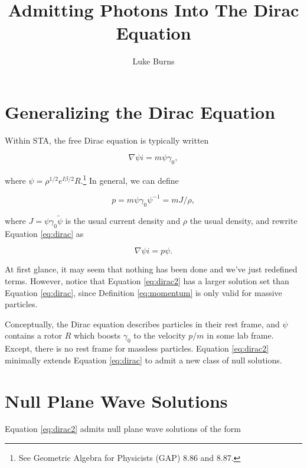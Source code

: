 \documentclass{article}
\title{Admitting Photons Into The Dirac Equation}
\author{Luke Burns}
\begin{document}
  \maketitle

  \section{Generalizing the Dirac Equation}

  Within STA, the free Dirac equation is typically written

  \begin{equation}
    \nabla \psi i = m \psi \gamma_0, \label{eq:dirac}
  \end{equation}

  where $\psi = \rho^{1/2} e^{I \beta / 2} R$.\footnote{See Geometric Algebra for Physicists (GAP) 8.86 and 8.87.} In general, we can define

  \begin{equation}
    p = m \psi \gamma_0 \psi^{-1} = m J / \rho, \label{eq:momentum}
  \end{equation} 
  
  where $J = \psi \gamma_0 \widetilde{\psi}$ is the usual current density and $\rho$ the usual density, and rewrite Equation \ref{eq:dirac} as

  \begin{equation}
    \nabla \psi i = p \psi. \label{eq:dirac2}
  \end{equation}

  At first glance, it may seem that nothing has been done and we've just redefined terms. However, notice that Equation \ref{eq:dirac2} has a larger solution set than Equation \ref{eq:dirac}, since Definition \ref{eq:momentum} is only valid for massive particles.
  
  Conceptually, the Dirac equation describes particles in their rest frame, and $\psi$ contains a rotor $R$ which boosts $\gamma_0$ to the velocity $p/m$ in some lab frame. Except, there is no rest frame for massless particles. Equation \ref{eq:dirac2} minimally extends Equation \ref{eq:dirac} to admit a new class of null solutions.

  \section{Null Plane Wave Solutions}

  Equation \ref{eq:dirac2} admits null plane wave solutions of the form
\end{document}
